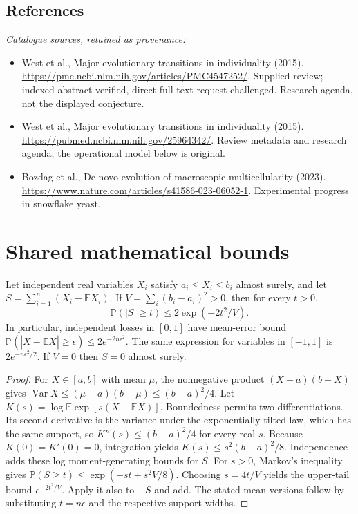 \documentclass[11pt]{article}
\begin{document}
\subsection{References}
\noindent\emph{Catalogue sources, retained as provenance:}
\begin{itemize}
\item West et al., Major evolutionary transitions in individuality (2015). \url{https://pmc.ncbi.nlm.nih.gov/articles/PMC4547252/}. Supplied review; indexed abstract verified, direct full-text request challenged. Research agenda, not the displayed conjecture.
\item West et al., Major evolutionary transitions in individuality (2015). \url{https://pubmed.ncbi.nlm.nih.gov/25964342/}. Review metadata and research agenda; the operational model below is original.
\item Bozdag et al., De novo evolution of macroscopic multicellularity (2023). \url{https://www.nature.com/articles/s41586-023-06052-1}. Experimental progress in snowflake yeast.
\end{itemize}




\section{Shared mathematical bounds}\label{app:bounds}
\begin{lemma}\label{lem:bounded}
Let independent real variables $X_i$ satisfy $a_i\leq X_i\leq b_i$ almost surely,
and let $S=\sum_{i=1}^n(X_i-\mathbb{E} X_i)$. If
$V=\sum_i(b_i-a_i)^2>0$, then for every $t>0$,
\[
 \mathbb{P}(|S|\geq t)\leq 2\exp(-2t^2/V).
\]
In particular, independent losses in $[0,1]$ have mean-error bound
$\mathbb{P}(|\overline X-\mathbb{E}\overline X|\geq\epsilon)
\leq2e^{-2n\epsilon^2}$. The same expression for variables in $[-1,1]$
is $2e^{-n\epsilon^2/2}$. If $V=0$ then $S=0$ almost surely.
\end{lemma}
\begin{proof}
For $X\in[a,b]$ with mean $\mu$, the nonnegative product
$(X-a)(b-X)$ gives
$\operatorname{Var} X\leq(\mu-a)(b-\mu)\leq(b-a)^2/4$.
Let $K(s)=\log\mathbb{E}\exp[s(X-\mathbb{E} X)]$.
Boundedness permits two differentiations. Its second derivative is the variance
under the exponentially tilted law, which has the same support, so
$K''(s)\leq(b-a)^2/4$ for every real $s$.
Because $K(0)=K'(0)=0$, integration yields
$K(s)\leq s^2(b-a)^2/8$.
Independence adds these log moment-generating bounds for $S$.
For $s>0$, Markov's inequality gives
$\mathbb{P}(S\geq t)\leq\exp(-st+s^2V/8)$.
Choosing $s=4t/V$ yields the upper-tail bound $e^{-2t^2/V}$.
Apply it also to $-S$ and add. The stated mean versions follow by substituting
$t=n\epsilon$ and the respective support widths.
\end{proof}
\end{document}
